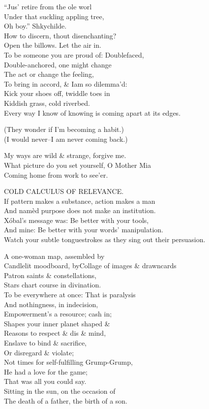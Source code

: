 ``Jus' retire from the ole worl \\
Under that suckling appling tree, \\
Oh boy.'' Shkychilde. \\ 
How to discern, thout disenchanting? \\
Open the billows. Let the air in. \\
To be someone you are proud of: Doublefaced, \\
Double-anchored, one might change \\
The act or change the feeling, \\
To bring in accord, \& Iam so dilemma'd: \\
Kick your shoes off, twiddle toes in \\
Kiddish grass, cold riverbed. \\
Every way I know of knowing is coming apart at its edges.

(They wonder if I'm becoming a habit.) \\
(I would never--I am never coming back.)

My ways are wild \& strange, forgive me. \\
What picture do you set yourself, O Mother Mia \\
Coming home from work to see'er.

COLD CALCULUS OF RELEVANCE. \\
If pattern makes a substance, action makes a man \\
And namèd purpose does not make an institution. \\
Xóbal's message was: Be better with your tools, \\
And mine: Be better with your words' manipulation. \\
Watch your subtle tonguestrokes as they sing out their persuasion.

A one-woman map, assembled by \\
Candlelit moodboard, byCollage of images \& drawncards \\
Patron saints \& constellations, \\
Stars chart course in divination. \\
To be everywhere at once: That is paralysis \\
And nothingness, in indecision, \\
Empowerment's a resource; cash in; \\
Shapes your inner planet shaped \& \\
Reasons to respect \& dis \& mind, \\
Enslave to bind \& sacrifice, \\
Or disregard \& violate; \\
Not times for self-fulfilling Grump-Grump, \\
He had a love for the game; \\
That was all you could say. \\
Sitting in the sun, on the occasion of \\
The death of a father, the birth of a son.

